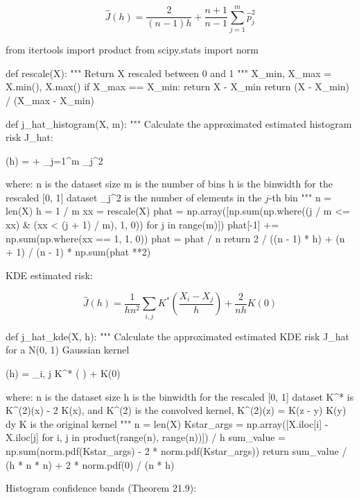 \[ \hat{J}(h) = \frac{2}{(n - 1)h} + \frac{n+1}{n-1} \sum_{j=1}^m \hat{p}_{j}^{2} \]

\begin{python}
from itertools import product
from scipy.stats import norm


def rescale(X):
    """
    Return X rescaled between 0 and 1
    """
    X_min, X_max = X.min(), X.max()
    if X_max == X_min:
        return X - X_min
    return (X - X_min) / (X_max - X_min)


def j_hat_histogram(X, m):
    """
    Calculate the approximated estimated histogram risk J_hat:
    
       (h) =  +  \sum_{j=1}^m _{j}^{2}
    
    where:
      n is the dataset size
      m is the number of bins
      h is the binwidth for the rescaled [0, 1] dataset
      _{j}^{2} is the number of elements in the $j$-th bin
    """
    n = len(X)
    h = 1 / m
    xx = rescale(X)
    phat = np.array([np.sum(np.where((j / m <= xx) & (xx < (j + 1) / m), 1, 0)) for j in range(m)])
    phat[-1] += np.sum(np.where(xx == 1, 1, 0))
    phat = phat / n
    return 2 / ((n - 1) * h) + (n + 1) / (n - 1) * np.sum(phat **2)
\end{python}

KDE estimated risk:

\[ \hat{J}(h) = \frac{1}{hn^{2}}\sum_{i, j} K^* \left( \frac{X_{i} - X_{j}}{h} \right) + \frac{2}{nh} K(0) \]

\begin{python}
def j_hat_{k}de(X, h):
    """
    Calculate the approximated estimated KDE risk J_hat for a N(0, 1) Gaussian kernel
    
      (h) = \sum_{i, j} K^* \left(  \right) +  K(0)
      
    where:
      n is the dataset size
      h is the binwidth for the rescaled [0, 1] dataset
      K^* is K^{(2)}(x) - 2 K(x), and K^{(2)} is the convolved kernel, K^{(2)}(z) = \int K(z - y) K(y) dy
      K is the original kernel
    """
    n = len(X)
    Kstar_args = np.array([X.iloc[i] - X.iloc[j] for i, j in product(range(n), range(n))]) / h
    sum_value = np.sum(norm.pdf(Kstar_args) - 2 * norm.pdf(Kstar_args))
    return sum_value / (h * n * n) + 2 * norm.pdf(0) / (n * h)
\end{python}

Histogram confidence bands (Theorem 21.9):

